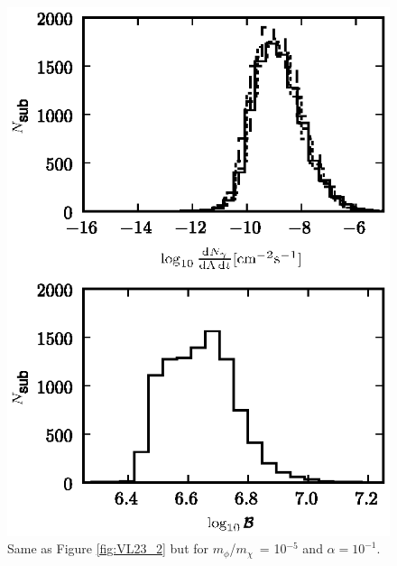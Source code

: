 \documentclass[aps,prd,twocolumn,amsmath,amssymb,floatfix,nofootinbib,10pt]{revtex4}
\newcommand{\mdm}{\ensuremath{m_{\chi}}}
\newcommand{\mv}{\ensuremath{m_{\phi}}}
\begin{document}
\begin{figure}
\centering
\includegraphics{hist_-5_-1_10_2.eps}
\caption{Same as Figure \ref{fig:VL23_2} but for \mv/\mdm\ = 10$^{-5}$
and $\alpha = 10^{-1}$.}%
\label{fig:VL51_1}%
\end{figure}
\end{document}
